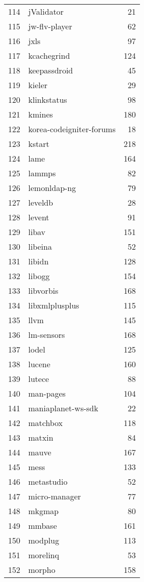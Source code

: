 \begin{table}[ht]
\begin{tabular}{rlr}
  114 & jValidator &  21 \\ 
  115 & jw-flv-player &  62 \\ 
  116 & jxls &  97 \\ 
  117 & kcachegrind & 124 \\ 
  118 & keepassdroid &  45 \\ 
  119 & kieler &  29 \\ 
  120 & klinkstatus &  98 \\ 
  121 & kmines & 180 \\ 
  122 & korea-codeigniter-forums &  18 \\ 
  123 & kstart & 218 \\ 
  124 & lame & 164 \\ 
  125 & lammps &  82 \\ 
  126 & lemonldap-ng &  79 \\ 
  127 & leveldb &  28 \\ 
  128 & levent &  91 \\ 
  129 & libav & 151 \\ 
  130 & libeina &  52 \\ 
  131 & libidn & 128 \\ 
  132 & libogg & 154 \\ 
  133 & libvorbis & 168 \\ 
  134 & libxmlplusplus & 115 \\ 
  135 & llvm & 145 \\ 
  136 & lm-sensors & 168 \\ 
  137 & lodel & 125 \\ 
  138 & lucene & 160 \\ 
  139 & lutece &  88 \\ 
  140 & man-pages & 104 \\ 
  141 & maniaplanet-ws-sdk &  22 \\ 
  142 & matchbox & 118 \\ 
  143 & matxin &  84 \\ 
  144 & mauve & 167 \\ 
  145 & mess & 133 \\ 
  146 & metastudio &  52 \\ 
  147 & micro-manager &  77 \\ 
  148 & mkgmap &  80 \\ 
  149 & mmbase & 161 \\ 
  150 & modplug & 113 \\ 
  151 & morelinq &  53 \\ 
  152 & morpho & 158 \\ 

\end{tabular}
\end{table}
